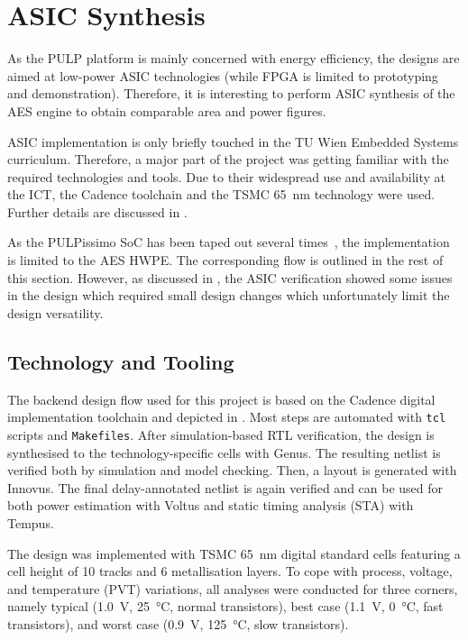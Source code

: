 \documentclass[a4paper, 12pt]{article}
\begin{document}
\pagebreak
\section{ASIC Synthesis} \label{sec:asic}

As the PULP platform is mainly concerned with energy efficiency, the designs are aimed at low-power ASIC technologies (while FPGA is limited to prototyping and demonstration). Therefore, it is interesting to perform ASIC synthesis of the AES engine to obtain comparable area and power figures.

ASIC implementation is only briefly touched in the TU Wien Embedded Systems curriculum. Therefore, a major part of the project was getting familiar with the required technologies and tools. Due to their widespread use and availability at the ICT, the Cadence toolchain and the TSMC \SI{65}{nm} technology were used. Further details are discussed in .

As the PULPissimo SoC has been taped out several times~\cite{pulp-chips}, the implementation is limited to the AES HWPE. The corresponding flow is outlined in the rest of this section. However, as discussed in , the ASIC verification showed some issues in the design which required small design changes which unfortunately limit the design versatility.

\subsection{Technology and Tooling} \label{sec:asic:tools}

The backend design flow used for this project is based on the Cadence digital implementation toolchain and depicted in . Most steps are automated with \texttt{tcl} scripts and \texttt{Makefiles}. After simulation-based RTL verification, the design is synthesised to the technology-specific cells with Genus. The resulting netlist is verified both by simulation and model checking. Then, a layout is generated with Innovus. The final delay-annotated netlist is again verified and can be used for both power estimation with Voltus and static timing analysis (STA) with Tempus.

The design was implemented with TSMC \SI{65}{nm} digital standard cells featuring a cell height of 10 tracks and 6 metallisation layers. To cope with process, voltage, and temperature (PVT) variations, all analyses were conducted for three corners, namely typical (\SI{1.0}{V}, \SI{25}{\degreeCelsius}, normal transistors), best case (\SI{1.1}{V}, \SI{0}{\degreeCelsius}, fast transistors), and worst case (\SI{0.9}{V}, \SI{125}{\degreeCelsius}, slow transistors).
\end{document}
